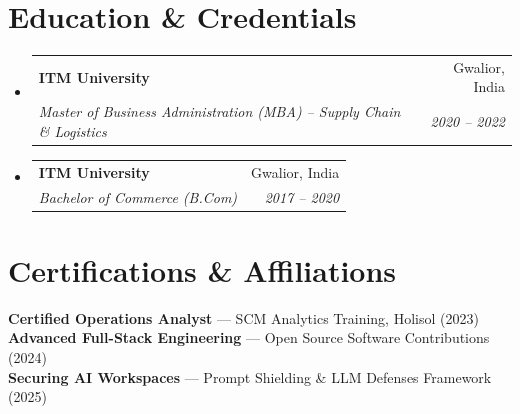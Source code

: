\documentclass[letterpaper,10pt]{article}
\makeatletter
\newcommand{\resumeSubheading}[4]{
  \vspace{-1pt}\item
    \begin{tabular*}{0.97\textwidth}[t]{l@{\extracolsep{\fill}}r}
      \textbf{\color{charcoal}#1} & #2 \\
      \textit{\small#3} & \textit{\small #4} \\
    \end{tabular*}\vspace{-5pt}
}
\newcommand{\resumeSubHeadingListStart}{\begin{itemize}[leftmargin=0.15in, label={}]}
\newcommand{\resumeSubHeadingListEnd}{\end{itemize}}
\makeatother
\begin{document}
\section{Education \& Credentials}
  \resumeSubHeadingListStart
    \resumeSubheading{ITM University}{Gwalior, India}
    {Master of Business Administration (MBA) -- Supply Chain \& Logistics}{2020 -- 2022}
    \resumeSubheading{ITM University}{Gwalior, India}
    {Bachelor of Commerce (B.Com)}{2017 -- 2020}
  \resumeSubHeadingListEnd

\section{Certifications \& Affiliations}
\begin{itemize}[leftmargin=0.15in, label={}]
    \small{\item{
     \textbf{Certified Operations Analyst} --- SCM Analytics Training, Holisol (2023) \\
     \textbf{Advanced Full-Stack Engineering} --- Open Source Software Contributions (2024) \\
     \textbf{Securing AI Workspaces} --- Prompt Shielding \& LLM Defenses Framework (2025)
    }}
\end{itemize}
\end{document}
